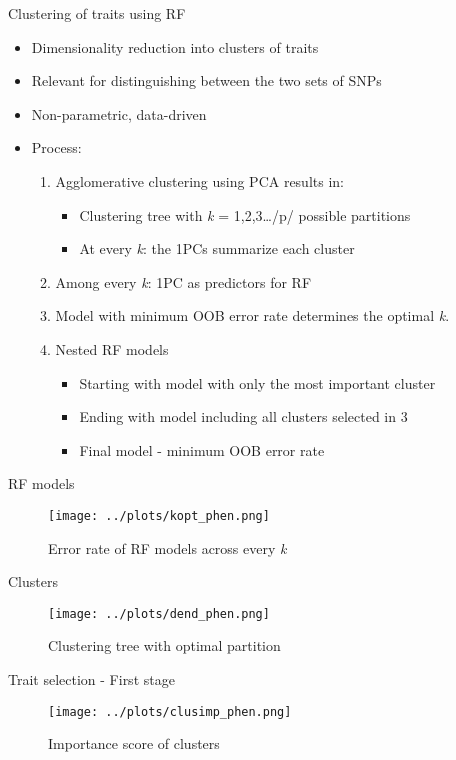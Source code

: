 \documentclass[presentation]{beamer}
\begin{document}
\begin{frame}[label={sec:org2ca6fbf}]{Clustering of traits using RF}
\begin{itemize}
\item Dimensionality reduction into clusters of traits
\item Relevant for distinguishing between the two sets of SNPs
\item Non-parametric, data-driven
\item Process:
\begin{enumerate}
\item Agglomerative clustering using PCA results in:
\begin{itemize}
\item Clustering tree with \emph{k} = 1,2,3\ldots{}/p/ possible partitions
\item At every \emph{k}: the 1PCs summarize each cluster
\end{itemize}
\item Among every \emph{k}: 1PC as predictors for RF
\item Model with minimum OOB error rate determines the optimal \emph{k}.
\item Nested RF models
\begin{itemize}
\item Starting with model with only the most important cluster
\item Ending with model including all clusters selected in \alert{3}
\item Final model - minimum OOB error rate
\end{itemize}
\end{enumerate}
\end{itemize}
\end{frame}
\begin{frame}[label={sec:org026bccc}]{RF models}
\begin{figure}[htbp]
\centering
\texttt{[image: ../plots/kopt\_phen.png]}
\caption[\emph{k}]{Error rate of RF models across every \emph{k}}
\end{figure}
\end{frame}
\begin{frame}[label={sec:orgc0d67d4}]{Clusters}
\begin{figure}[htbp]
\centering
\texttt{[image: ../plots/dend\_phen.png]}
\caption{Clustering tree with optimal partition}
\end{figure}
\end{frame}
\begin{frame}[label={sec:org914555e}]{Trait selection - First stage}
\begin{figure}[htbp]
\centering
\texttt{[image: ../plots/clusimp\_phen.png]}
\caption{Importance score of clusters}
\end{figure}
\end{frame}
\end{document}
